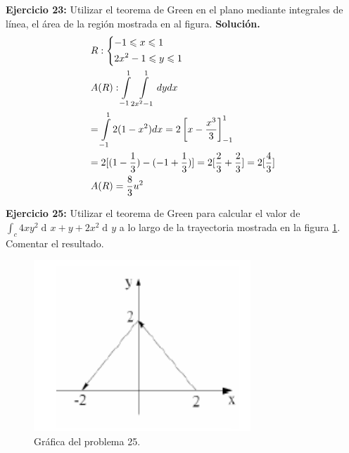 \documentclass[12pt]{article}
\DeclareMathOperator{\di}{d\!}
\begin{document}
\vspace{5mm}

\noindent \textbf{Ejercicio 23:} Utilizar el teorema de Green en el plano mediante integrales de línea, el área de la región mostrada en al figura.
\vspace{5mm}
\noindent \textbf{Solución.}
\vspace{5mm}
\[\begin{gathered}
  R:\left\{ \begin{gathered}
   - 1 \leqslant x \leqslant 1 \hfill \\
  2{x^2} - 1 \leqslant y \leqslant 1 \hfill \\ 
\end{gathered}  \right. \hfill \\
  A(R):\int\limits_{ - 1}^1 {\int\limits_{2{x^2} - 1}^1 {dydx} }  \hfill \\
   = \int\limits_{ - 1}^1 {2(1 - {x^2})dx}  = 2\left[ {x - \frac{{{x^3}}}{3}} \right]_{ - 1}^1 \hfill \\
   = 2[(1 - \frac{1}{3}) - ( - 1 + \frac{1}{3})] = 2[\frac{2}{3} + \frac{2}{3}] = 2[\frac{4}{3}] \hfill \\
  A(R) = \frac{8}{3}{u^2} \hfill \\ 
\end{gathered} \]



\noindent \textbf{Ejercicio 25:}  Utilizar el teorema de Green para calcular el valor de
$\int_c 4xy^2 \di x + y+2x^2 \di y$ a lo largo de la trayectoria mostrada en la figura \ref{ej25}. Comentar el resultado.

\begin{figure}[!htbp] 
	\label{ej25}
	\centering
	\includegraphics[scale = 1]{problema25.png}
	\caption{Gráfica del problema 25.}
\end{figure}

\vspace{5mm}
\end{document}
